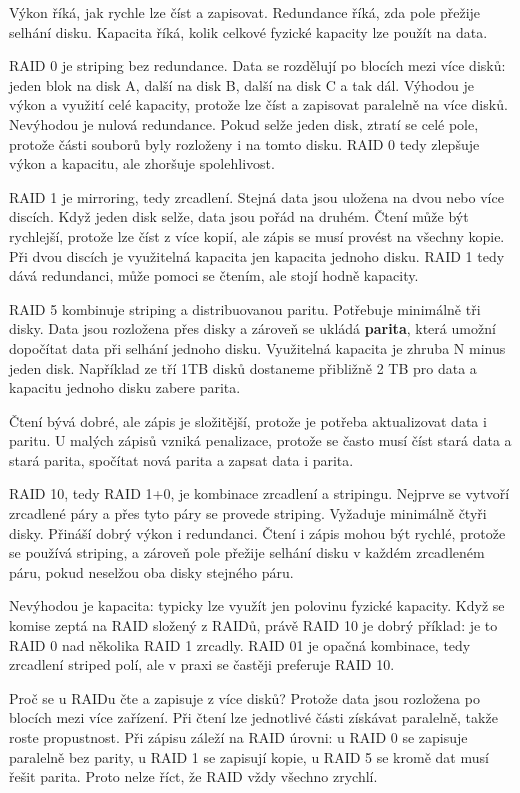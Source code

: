 Výkon říká, jak rychle lze číst a zapisovat. Redundance říká, zda pole přežije selhání disku. Kapacita říká, kolik celkové fyzické kapacity lze použít na data.

RAID 0 je striping bez redundance. Data se rozdělují po blocích mezi více disků: jeden blok na disk A, další na disk B, další na disk C a tak dál. Výhodou je výkon a využití celé kapacity, protože lze číst a zapisovat paralelně na více disků. Nevýhodou je nulová redundance. Pokud selže jeden disk, ztratí se celé pole, protože části souborů byly rozloženy i na tomto disku. RAID 0 tedy zlepšuje výkon a kapacitu, ale zhoršuje spolehlivost.

RAID 1 je mirroring, tedy zrcadlení. Stejná data jsou uložena na dvou nebo více discích. Když jeden disk selže, data jsou pořád na druhém. Čtení může být rychlejší, protože lze číst z více kopií, ale zápis se musí provést na všechny kopie. Při dvou discích je využitelná kapacita jen kapacita jednoho disku. RAID 1 tedy dává redundanci, může pomoci se čtením, ale stojí hodně kapacity.

RAID 5 kombinuje striping a distribuovanou paritu. Potřebuje minimálně tři disky. Data jsou rozložena přes disky a zároveň se ukládá \textbf{parita}, která umožní dopočítat data při selhání jednoho disku. Využitelná kapacita je zhruba N minus jeden disk. Například ze tří 1TB disků dostaneme přibližně 2 TB pro data a kapacitu jednoho disku zabere parita.

Čtení bývá dobré, ale zápis je složitější, protože je potřeba aktualizovat data i paritu. U malých zápisů vzniká penalizace, protože se často musí číst stará data a stará parita, spočítat nová parita a zapsat data i parita.

RAID 10, tedy RAID 1+0, je kombinace zrcadlení a stripingu. Nejprve se vytvoří zrcadlené páry a přes tyto páry se provede striping. Vyžaduje minimálně čtyři disky. Přináší dobrý výkon i redundanci. Čtení i zápis mohou být rychlé, protože se používá striping, a zároveň pole přežije selhání disku v každém zrcadleném páru, pokud neselžou oba disky stejného páru.

Nevýhodou je kapacita: typicky lze využít jen polovinu fyzické kapacity. Když se komise zeptá na RAID složený z RAIDů, právě RAID 10 je dobrý příklad: je to RAID 0 nad několika RAID 1 zrcadly. RAID 01 je opačná kombinace, tedy zrcadlení striped polí, ale v praxi se častěji preferuje RAID 10.

Proč se u RAIDu čte a zapisuje z více disků? Protože data jsou rozložena po blocích mezi více zařízení. Při čtení lze jednotlivé části získávat paralelně, takže roste propustnost. Při zápisu záleží na RAID úrovni: u RAID 0 se zapisuje paralelně bez parity, u RAID 1 se zapisují kopie, u RAID 5 se kromě dat musí řešit parita. Proto nelze říct, že RAID vždy všechno zrychlí.

